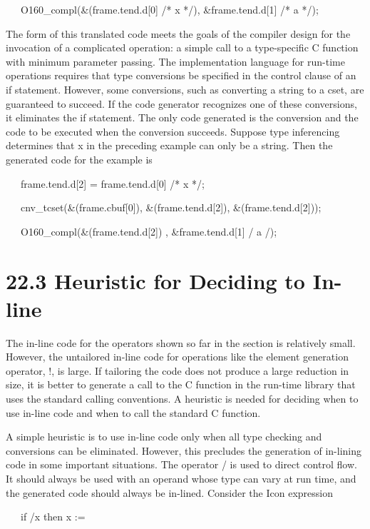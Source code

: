 {\ttfamily\mdseries
\ \ \ O160\_compl(\&(frame.tend.d[0] /* x */), \&frame.tend.d[1] /* a */);}


The form of this translated code meets the goals of the compiler
design for the invocation of a complicated operation: a simple call to
a type-specific C function with minimum parameter passing. The
implementation language for run-time operations requires that type
conversions be specified in the control clause of an if
statement. However, some conversions, such as converting a string to a
cset, are guaranteed to succeed. If the code generator recognizes one
of these conversions, it eliminates the if statement. The only code
generated is the conversion and the code to be executed when the
conversion succeeds. Suppose type inferencing determines that x in the
preceding example can only be a string. Then the generated code for
the example is

{\ttfamily\mdseries
\ \ \ frame.tend.d[2] = frame.tend.d[0] /* x */;}

{\ttfamily\mdseries
\ \ \ cnv\_tcset(\&(frame.cbuf[0]), \&(frame.tend.d[2]), \&(frame.tend.d[2]));}

{\ttfamily\mdseries
\ \ \ O160\_compl(\&(frame.tend.d[2]) , \&frame.tend.d[1] / a /);}


\section[22.3 Heuristic for Deciding to In-line]{22.3 Heuristic for Deciding to In-line}

The in-line code for the operators shown so far in the section is
relatively small. However, the untailored in-line code for operations
like the element generation operator, !, is large. If tailoring the
code does not produce a large reduction in size, it is better to
generate a call to the C function in the run-time library that uses
the standard calling conventions. A heuristic is needed for deciding
when to use in-line code and when to call the standard C function.


A simple heuristic is to use in-line code only when all type checking
and conversions can be eliminated. However, this precludes the
generation of in-lining code in some important situations. The
operator / is used to direct control flow.  It should always be used
with an operand whose type can vary at run time, and the generated
code should always be in-lined. Consider the Icon expression

{\ttfamily\mdseries
\ \ \ if /x then x := }

